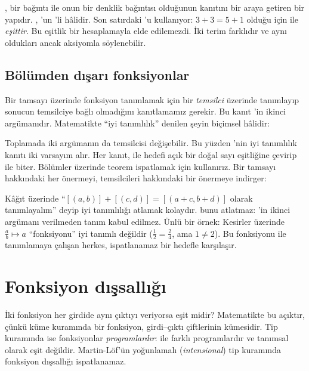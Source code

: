 \noindent {}, bir bağıntı ile onun bir denklik bağıntısı olduğunun
kanıtını bir araya getiren bir yapıdır. , 'un
'li hâlidir. Son satırdaki  'u
kullanıyor: $3 + 3 = 5 + 1$ olduğu için  ile
 \emph{eşittir}. Bu eşitlik bir hesaplamayla elde
edilemezdi. İki terim farklıdır ve aynı oldukları ancak aksiyomla
söylenebilir.

\subsection{Bölümden dışarı fonksiyonlar}

Bir tamsayı üzerinde fonksiyon tanımlamak için bir \emph{temsilci} üzerinde
tanımlayıp sonucun temsilciye bağlı olmadığını kanıtlamamız gerekir.
Bu kanıt 'in ikinci argümanıdır. Matematikte ``iyi
tanımlılık'' denilen şeyin biçimsel hâlidir:


\noindent Toplamada iki argümanın da temsilcisi değişebilir. Bu yüzden
'nin iyi tanımlılık kanıtı iki varsayım alır. Her
kanıt,  ile hedefi açık bir doğal sayı eşitliğine çevirip
 ile biter. Bölümler üzerinde teorem ispatlamak için
 kullanırız. Bir tamsayı hakkındaki her önermeyi,
temsilcileri hakkındaki bir önermeye indirger:


\begin{dikkat}
Kâğıt üzerinde ``$[(a,b)] + [(c,d)] = [(a+c, b+d)]$ olarak tanımlayalım''
deyip iyi tanımlılığı atlamak kolaydır. \Lean{} bunu atlatmaz:
'in ikinci argümanı verilmeden tanım kabul edilmez.
Ünlü bir örnek: Kesirler üzerinde $\frac{a}{b} \mapsto a$ ``fonksiyonu''
iyi tanımlı değildir ($\frac12 = \frac24$, ama $1 \neq 2$). Bu fonksiyonu
 ile tanımlamaya çalışan herkes, ispatlanamaz bir hedefle
karşılaşır.
\end{dikkat}

\section{Fonksiyon dışsallığı}\label{sec:funext}

İki fonksiyon her girdide aynı çıktıyı veriyorsa eşit midir? Matematikte
bu açıktır, çünkü küme kuramında bir fonksiyon, girdi--çıktı çiftlerinin
kümesidir. Tip kuramında ise fonksiyonlar \emph{programlardır}:
 ile  farklı programlardır ve
tanımsal olarak eşit değildir. Martin-Löf'ün yoğunlamalı (\emph{intensional})
tip kuramında fonksiyon dışsallığı ispatlanamaz.

